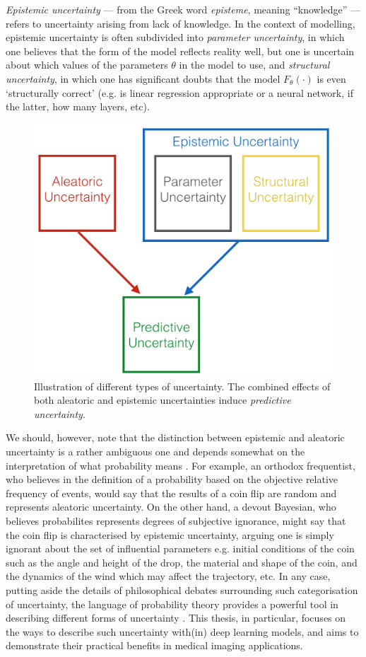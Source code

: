 \textit{Epistemic uncertainty} — from the Greek word \textit{episteme}, meaning “knowledge” — refers to uncertainty arising from lack of knowledge. In the context of modelling, epistemic uncertainty is often subdivided into \textit{parameter uncertainty}, in which one believes that the form of the model reflects reality well, but one is uncertain about which values of the parameters $\theta$ in the model to use, and \textit{structural uncertainty}, in which one has significant doubts that the model $F_{\theta}(\cdot)$ is even ‘structurally correct’ (e.g. is linear regression appropriate or a neural network, if the latter, how many layers, etc).


\begin{figure}[ht]
	\vspace{-2mm}
	\includegraphics[width=0.4\linewidth]{chapter_1/uncertainty_taxonomy.png}
	\centering	
	\vspace{-2mm}
	\caption{\footnotesize Illustration of different types of uncertainty. The combined effects of both aleatoric and epistemic uncertainties induce \textit{predictive uncertainty}.  } 
	\vspace{-4mm}
	\label{fig:uncertainty_taxonomy}
\end{figure}

We should, however, note that the distinction between epistemic and aleatoric uncertainty is a rather ambiguous one and depends somewhat on the interpretation of what probability means \cite{cox2006principles,samaniego2010comparison}. For example, an orthodox frequentist, who believes in the definition of a probability based on the objective relative frequency of events, would say that the results of a coin flip are random and represents aleatoric uncertainty.  On the other hand, a devout Bayesian, who believes probabilites represents degrees of subjective ignorance, might say that the coin flip is characterised by epistemic uncertainty, arguing one is simply ignorant about the set of influential parameters e.g. initial conditions of the coin such as the angle and height of the drop, the material and shape of the coin, and the dynamics of the wind which may affect the trajectory, etc. In any case, putting aside the details of philosophical debates surrounding such categorisation of uncertainty, the language of probability theory provides a powerful tool in describing different forms of uncertainty \cite{sullivan2015introduction}. This thesis, in particular, focuses on the ways to describe such uncertainty with(in) deep learning models, and aims to demonstrate their practical benefits in medical imaging applications. 

